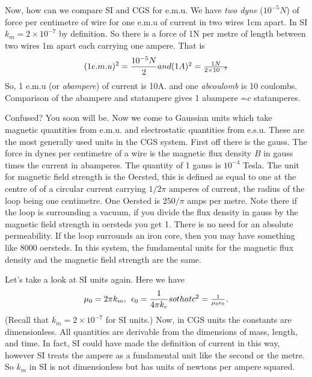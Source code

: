 Now, how can we compare SI and CGS for e.m.u. We have {\it two dyne} ($10^{-5}N$)
 of force per centimetre of wire for one e.m.u of current in two wires 1cm apart. In SI $k_m=2 \times 10^{-7}$ by definition. So there is a  force of 1N 
 per metre of length  between two wires 1m apart each carrying one ampere.
That is
\begin{equation}
(1 e.m.u)^2 = \frac{10^{-5} N}{2}
$$ and   $$
(1 A)^2 = \frac{1 N}{2 \times 10^{-7}}
\end{equation}
So, 1 e.m.u (or {\it abampere}) of current is 10A. and one {\it abcoulomb}
is 10 coulombs. Comparison of the abampere and statampere gives 1 abampere =$c$ statamperes.

Confused? You soon will be. Now we come to Gaussian units which take magnetic
quantities from e.m.u. and electrostatic quantities from e.s.u. These are the most generally used units in the CGS system.
 First off
there is the gauss. The force in dynes per centimetre of a wire
is the magnetic flux density $B$ in gauss times the current in abamperes. The quantity of 1 gauss is $10^{-4}$ Tesla. The unit for magnetic field strength is the Oersted, this is defined as equal to one at the centre of of a circular current carrying $1/2 \pi$ amperes of current, the radius of the loop being one centimetre.
One Oersted is $250/\pi$ amps  per metre. Note there if the loop is surrounding a vacuum, if you divide the flux density in gauss by the magnetic field 
strength in oersteds you get 1. There is no need for an absolute permeability.
If the loop surrounds an iron core, then you may have something like 8000 oersteds. In this system, the fundamental units for the magnetic flux density and the magnetic field strength are the same.

Let's take a look at SI units again. Here we have
\begin{equation}
\mu_0=2 \pi k_m,  \> \> \epsilon_0=\frac{1}{4 \pi k_e}
$$ so that  $$
c^2=\frac{1}{\mu_0 \epsilon_0}.
\end{equation}
(Recall that $k_m=2 \times 10^{-7}$ for SI units.) Now, in CGS units the constants are dimensionless. All quantities are derivable from the dimensions of mass, length, and time. In fact, SI could have made the definition of current in this way, however SI treats the ampere as a fundamental unit like the second or the metre. So $k_m$ in SI is not dimensionless but has units of newtons per ampere squared.

